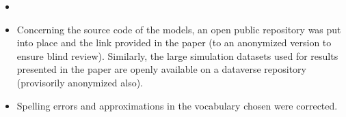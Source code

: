 \documentclass[11pt,a4paper,sans]{moderncv}        %
\begin{document}
\begin{itemize}
	\item {}
	
	\item Concerning the source code of the models, an open public repository was put into place and the link provided in the paper (to an anonymized version to ensure blind review). Similarly, the large simulation datasets used for results presented in the paper are openly available on a dataverse repository (provisorily anonymized also).
	
	\item Spelling errors and approximations in the vocabulary chosen were corrected.
\end{itemize}







\justify




\makeletterclosing
\end{document}
